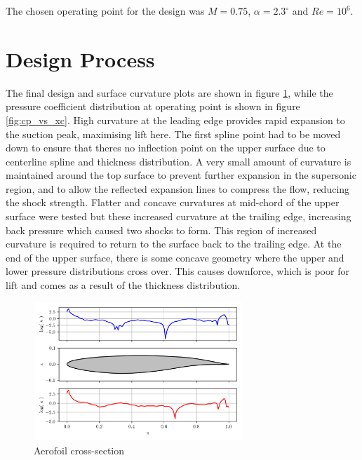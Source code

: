 \documentclass{article}
\begin{document}
The chosen operating point for the design was $M=0.75$, $\alpha = 2.3^\circ$ and $Re=10^6$.
 
\section{Design Process}

The final design and surface curvature plots are shown in figure \ref{fig:airfoil}, while the pressure coefficient distribution at operating point is shown in figure \ref{fig:cp_vs_xc}.
High curvature at the leading edge provides rapid expansion to the suction peak, maximising lift here.
The first spline point had to be moved down to ensure that theres no inflection point on the upper surface due to centerline spline and thickness distribution.
A very small amount of curvature is maintained around the top surface to prevent further expansion in the supersonic region,
and to allow the reflected expansion lines to compress the flow, reducing the shock strength.
Flatter and concave curvatures at mid-chord of the upper surface were tested but these increased curvature at the trailing edge, increasing back pressure which caused two shocks to form.
This region of increased curvature is required to return to the surface back to the trailing edge.
At the end of the upper surface, there is some concave geometry where the upper and lower pressure distributions cross over.
This causes downforce, which is poor for lift and comes as a result of the thickness distribution.

\begin{figure}[H]
    \centering
    \includegraphics[width=0.7\textwidth]{figures/airfoil.png}
    \caption{Aerofoil cross-section}
    \label{fig:airfoil}
\end{figure}
\end{document}
